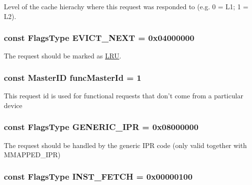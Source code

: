 \label{classRequest_acb5ba97551079e0b072c62c21d784ac5}
Level of the cache hierachy where this request was responded to (e.g. 0 = L1; 1 = L2). \hypertarget{classRequest_ad9597d026fc64bd3cc9b56e2bafca9f4}{
\subsubsection[{EVICT\_\-NEXT}]{\setlength{\rightskip}{0pt plus 5cm}const {\bf FlagsType} {\bf EVICT\_\-NEXT} = 0x04000000}}
\label{classRequest_ad9597d026fc64bd3cc9b56e2bafca9f4}
The request should be marked as \hyperlink{classLRU}{LRU}. \hypertarget{classRequest_a2d69ed2b2928ccd91cc225b403200c4e}{
\subsubsection[{funcMasterId}]{\setlength{\rightskip}{0pt plus 5cm}const {\bf MasterID} {\bf funcMasterId} = 1}}
\label{classRequest_a2d69ed2b2928ccd91cc225b403200c4e}
This request id is used for functional requests that don't come from a particular device \hypertarget{classRequest_accd8911f1ee38787b977ee8f122dcd5d}{
\subsubsection[{GENERIC\_\-IPR}]{\setlength{\rightskip}{0pt plus 5cm}const {\bf FlagsType} {\bf GENERIC\_\-IPR} = 0x08000000}}
\label{classRequest_accd8911f1ee38787b977ee8f122dcd5d}
The request should be handled by the generic IPR code (only valid together with MMAPPED\_\-IPR) \hypertarget{classRequest_a1137c9aff3d0aa2d9c0fafeb06ec7bc3}{
\subsubsection[{INST\_\-FETCH}]{\setlength{\rightskip}{0pt plus 5cm}const {\bf FlagsType} {\bf INST\_\-FETCH} = 0x00000100}}
